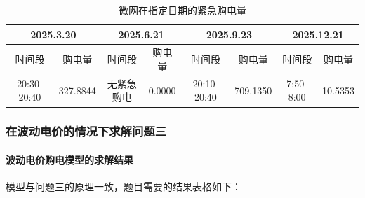 \documentclass[withoutpreface,bwprint]{cumcmthesis}
\begin{document}
\begin{table}[h!]
	\centering
	\footnotesize
	\renewcommand{\arraystretch}{1.2}
	\setlength{\tabcolsep}{8pt}
	\caption{微网在指定日期的紧急购电量}
	\label{tab:q42_spec_3}
	\begin{tabular}{|c|c|c|c|c|c|c|c|}
		\hline
		\multicolumn{2}{|c|}{2025.3.20} & \multicolumn{2}{c|}{2025.6.21} & \multicolumn{2}{c|}{2025.9.23} & \multicolumn{2}{c|}{2025.12.21} \\ \hline
		时间段 & 购电量 & 时间段 & 购电量 & 时间段 & 购电量 & 时间段 & 购电量 \\ \hline
		20:30-20:40 & 327.8844 & 无紧急购电 & 0.0000 & 20:10-20:40 & 709.1350 & 7:50-8:00 & 10.5353 \\ \hline
	\end{tabular}
\end{table}






\newpage
\subsubsection{在波动电价的情况下求解问题三}

\paragraph{波动电价购电模型的求解结果}

模型与问题三的原理一致，题目需要的结果表格如下：
\end{document}
